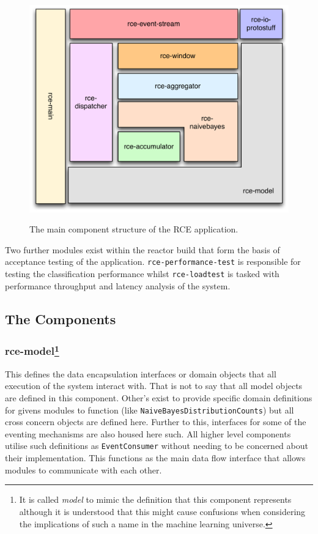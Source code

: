 \documentclass[a4paper,11pt]{scrreprt}
\begin{document}
\begin{figure}[h!]
\centering
\caption{The main component structure of the RCE application.}
\includegraphics[scale=0.35, trim=0 0 0 0, clip=true] {reactor-layout.pdf}
\label{fig:indexes}
\end{figure}

Two further modules exist within the reactor build that form the basis of acceptance testing of the application. \verb|rce-performance-test| is responsible for testing the classification performance whilst \verb|rce-loadtest| is tasked with performance throughput and latency analysis of the system.

\subsection{The Components}
\subsubsection[rce-model]{rce-model\protect\footnote{It is called \textit{model} to mimic the  definition that this component represents although it is understood that this might cause confusions when considering the implications of such a name in the machine learning universe.}}
This defines the data encapsulation interfaces or domain objects that all execution of the system interact with. That is not to say that all model objects are defined in this component. Other's exist to provide specific domain definitions for givens modules to function (like \verb|NaiveBayesDistributionCounts|) but all cross concern objects are defined here. Further to this, interfaces for some of the eventing mechanisms are also housed here such. All higher level components utilise such definitions as \verb|EventConsumer| without needing to be concerned about their implementation. This functions as the main data flow interface that allows modules to communicate with each other.
\end{document}
